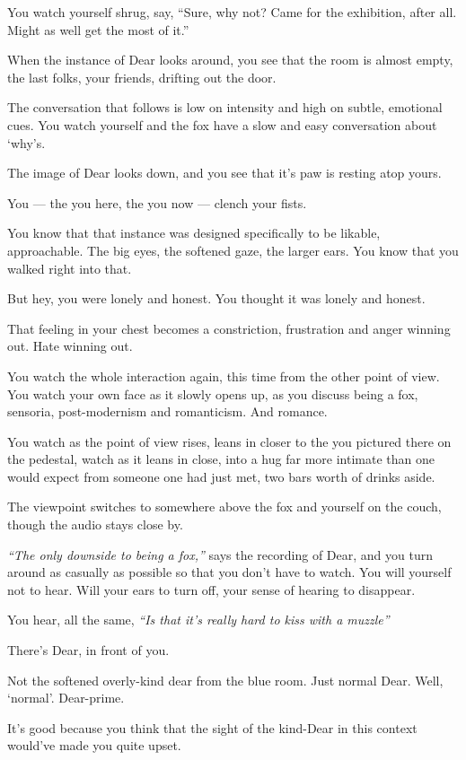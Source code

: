You watch yourself shrug, say, ``Sure, why not? Came for the exhibition, after all. Might as well get the most of it.''

When the instance of Dear looks around, you see that the room is almost empty, the last folks, your friends, drifting out the door.

The conversation that follows is low on intensity and high on subtle, emotional cues. You watch yourself and the fox have a slow and easy conversation about `why's.

The image of Dear looks down, and you see that it's paw is resting atop yours.

You --- the you here, the you now --- clench your fists.

You know that that instance was designed specifically to be likable, approachable. The big eyes, the softened gaze, the larger ears. You know that you walked right into that.

But hey, you were lonely and honest. You thought it was lonely and honest.

That feeling in your chest becomes a constriction, frustration and anger winning out. Hate winning out.

You watch the whole interaction again, this time from the other point of view. You watch your own face as it slowly opens up, as you discuss being a fox, sensoria, post-modernism and romanticism. And romance.

You watch as the point of view rises, leans in closer to the you pictured there on the pedestal, watch as it leans in close, into a hug far more intimate than one would expect from someone one had just met, two bars worth of drinks aside.

The viewpoint switches to somewhere above the fox and yourself on the couch, though the audio stays close by.

\emph{``The only downside to being a fox,''} says the recording of Dear, and you turn around as casually as possible so that you don't have to watch. You will yourself not to hear. Will your ears to turn off, your sense of hearing to disappear.

You hear, all the same, \emph{``Is that it's really hard to kiss with a muzzle''}

There's Dear, in front of you.

Not the softened overly-kind dear from the blue room. Just normal Dear. Well, `normal'. Dear-prime.

It's good because you think that the sight of the kind-Dear in this context would've made you quite upset.

